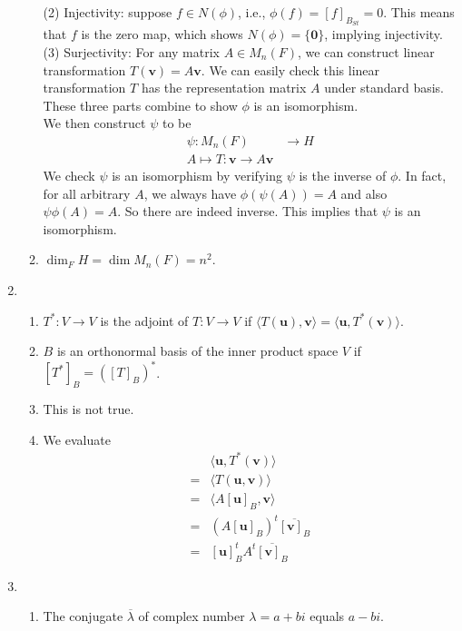 \documentclass[12pt]{article}
\theoremstyle{definition}
\begin{document}
\begin{enumerate}
\begin{enumerate}
          (2) Injectivity: suppose $f\in N(\phi)$, i.e., $\phi(f)=[f]_{B_{St}}=0$. This means that $f$ is the zero map, which shows $N(\phi)=\{\mathbf{0}\}$, implying injectivity.\\
          (3) Surjectivity: For any matrix $A\in M_n(F)$, we can construct linear transformation $T(\mathbf{v})=A\mathbf{v}$. We can easily check this linear transformation $T$ has the representation matrix $A$ under standard basis.\\
          These three parts combine to show $\phi$ is an isomorphism.\\
          We then construct $\psi$ to be
                    \begin{align*}
\psi: M_n(F)&\to H\\
      A\mapsto T: \mathbf{v}\to A\mathbf{v} 
          \end{align*}
          We check $\psi$ is an isomorphism by verifying $\psi$ is the inverse of $\phi$. In fact, for all arbitrary $A$, we always have $\phi(\psi(A))=A$ and also $\psi\phi(A)=A$. So there are indeed inverse. This implies that $\psi$ is an isomorphism.
          \item $\dim_F H = \dim M_n(F)=n^2$.
        \end{enumerate}
  \item \begin{enumerate}
    \item $T^\ast: V\to V$ is the adjoint of $T:V\to V$ if $\langle T(\mathbf{u}), \mathbf{v}\rangle=\langle \mathbf{u}, T^\ast(\mathbf{v})\rangle$.  
    \item $B$ is an orthonormal basis of the inner product space $V$ if $[T^\ast]_B=([T]_B)^\ast$.
    \item This is not true. 
    \item We evaluate 
    \begin{align*}
  &\langle \mathbf{u}, T^\ast(\mathbf{v})\rangle\\
  =&\langle T(\mathbf{u}, \mathbf{v})\rangle\\
  =&\langle A[\mathbf{u}]_B, \mathbf{v}\rangle\\
  =&(A[\mathbf{u}]_B)^t \overline{[\mathbf{v}]_B}\\
  =&[\mathbf{u}]_B^tA^t\overline{[\mathbf{v}]_B}
    \end{align*}
  \end{enumerate}
  \item \begin{enumerate}
    \item The conjugate $\overline{\lambda}$ of complex number $\lambda = a+ bi$ equals $a-bi$.

\end{enumerate}
\end{enumerate}
\end{document}
